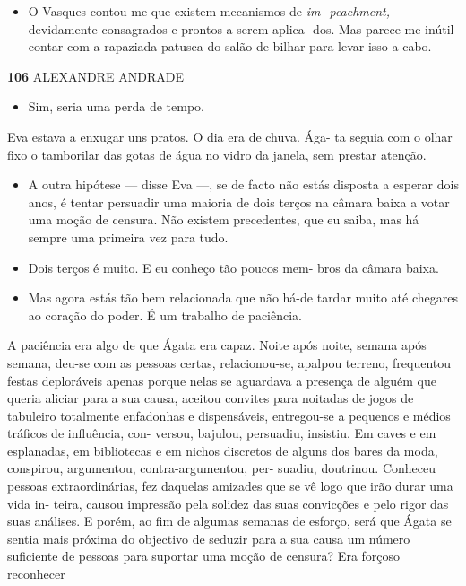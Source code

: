 \begin{itemize}
\tightlist
\item
  O Vasques contou-me que existem mecanismos de \emph{im- peachment,
  }devidamente consagrados e prontos a serem aplica- dos. Mas parece-me
  inútil contar com a rapaziada patusca do salão de bilhar para levar
  isso a cabo.
\end{itemize}

\textbf{106 }ALEXANDRE ANDRADE

\begin{itemize}
\tightlist
\item
  Sim, seria uma perda de tempo.
\end{itemize}

Eva estava a enxugar uns pratos. O dia era de chuva. Ága- ta seguia com
o olhar fixo o tamborilar das gotas de água no vidro da janela, sem
prestar atenção.

\begin{itemize}
\tightlist
\item
  A outra hipótese --- disse Eva ---, se de facto não estás disposta a
  esperar dois anos, é tentar persuadir uma maioria de dois terços na
  câmara baixa a votar uma moção de censura. Não existem precedentes,
  que eu saiba, mas há sempre uma primeira vez para tudo.
\item
  Dois terços é muito. E eu conheço tão poucos mem- bros da câmara
  baixa.
\item
  Mas agora estás tão bem relacionada que não há-de tardar muito até
  chegares ao coração do poder. É um trabalho de paciência.
\end{itemize}

A paciência era algo de que Ágata era capaz. Noite após noite, semana
após semana, deu-se com as pessoas certas, relacionou-se, apalpou
terreno, frequentou festas deploráveis apenas porque nelas se aguardava
a presença de alguém que queria aliciar para a sua causa, aceitou
convites para noitadas de jogos de tabuleiro totalmente enfadonhas e
dispensáveis, entregou-se a pequenos e médios tráficos de influência,
con- versou, bajulou, persuadiu, insistiu. Em caves e em esplanadas, em
bibliotecas e em nichos discretos de alguns dos bares da moda,
conspirou, argumentou, contra-argumentou, per- suadiu, doutrinou.
Conheceu pessoas extraordinárias, fez daquelas amizades que se vê logo
que irão durar uma vida in- teira, causou impressão pela solidez das
suas convicções e pelo rigor das suas análises. E porém, ao fim de
algumas semanas de esforço, será que Ágata se sentia mais próxima do
objectivo de seduzir para a sua causa um número suficiente de pessoas
para suportar uma moção de censura? Era forçoso reconhecer

